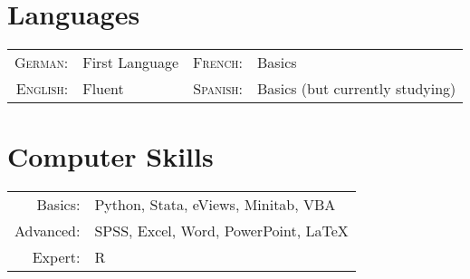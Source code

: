 \documentclass[a4paper,10pt]{article} %
\begin{document}

\section{Languages}

\begin{tabular}{rlrl}
\textsc{German:} & First Language & \textsc{French:} & Basics\\
\textsc{English:} & Fluent &\textsc{Spanish:}& Basics (but currently studying)\\
\end{tabular}

\section{Computer Skills}
\begin{tabular}{rl}
Basics: & Python, Stata, eViews, Minitab, VBA\\

Advanced: & SPSS, Excel, Word, PowerPoint, LaTeX\\

Expert: & R
\end{tabular}



\end{document}
